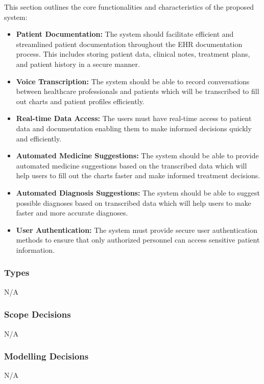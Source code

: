 \documentclass[12pt]{article}
\begin{document}
This section outlines the core functionalities and characteristics of the proposed system:

\begin{itemize}
  \item \textbf{Patient Documentation:} The system should facilitate efficient and streamlined patient documentation throughout the EHR documentation process. This includes storing patient data, clinical notes, treatment plans, and patient history in a secure manner.
  
  \item \textbf{Voice Transcription:} The system should be able to record conversations between healthcare professionals and patients which will be transcribed to fill out charts and patient profiles efficiently.
  
  \item \textbf{Real-time Data Access:} The users must have real-time access to patient data and documentation enabling them to make informed decisions quickly and efficiently.
  
  \item \textbf{Automated Medicine Suggestions:} The system should be able to provide automated medicine suggestions based on the transcribed data which will help users to fill out the charts faster and make informed treatment decisions.
  
  \item \textbf{Automated Diagnosis Suggestions:} The system should be able to suggest possible diagnoses based on transcribed data which will help users to make faster and more accurate diagnoses.
  
  \item \textbf{User Authentication:} The system must provide secure user authentication methods to ensure that only authorized personnel can access sensitive patient information.
  
\end{itemize}

\subsubsection{Types} \label{sec_Types}
N/A

\subsubsection{Scope Decisions} \label{sec_ScopeDecisions}
N/A

\subsubsection{Modelling Decisions} \label{sec_ModellingDecisions}
N/A
\end{document}
